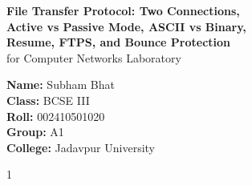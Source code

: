\documentclass[11pt,a4paper]{article}
\begin{document}
\begin{titlepage}
    \centering
    \vspace*{4.2cm}

    {\LARGE \textbf{File Transfer Protocol: Two Connections,}}\\[0.7em]
    {\LARGE \textbf{Active vs Passive Mode, ASCII vs Binary,}}\\[0.7em]
    {\LARGE \textbf{Resume, FTPS, and Bounce Protection}}\\[1.4em]

    {\large for Computer Networks Laboratory}

    \vspace{3.8cm}

    {\large
    \textbf{Name:} Subham Bhat\\[0.55em]
    \textbf{Class:} BCSE III\\[0.55em]
    \textbf{Roll:} 002410501020\\[0.55em]
    \textbf{Group:} A1\\[0.55em]
    \textbf{College:} Jadavpur University
    }

    \vfill
    {\normalsize 1}
\end{titlepage}

\setcounter{page}{2}
\tableofcontents
\newpage

\setcounter{page}{3}
\end{document}
